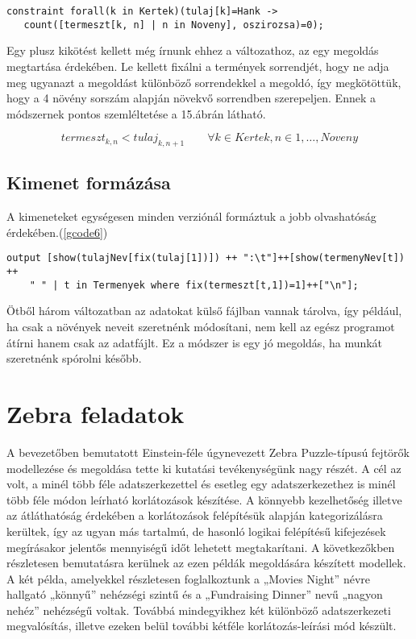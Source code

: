 \documentclass[12pt,a4paper]{report}
\begin{document}
   \begin{lstlisting}[caption="Count" bemutatása, label=gcode5]
   constraint forall(k in Kertek)(tulaj[k]=Hank ->
   count([termeszt[k, n] | n in Noveny], oszirozsa)=0); \end{lstlisting}

    Egy plusz kikötést kellett még írnunk ehhez a változathoz, az egy megoldás megtartása érdekében.
    Le kellett fixálni a termények sorrendjét, hogy ne adja meg ugyanazt a megoldást különböző sorrendekkel a megoldó, így megkötöttük, hogy a 4 növény sorszám alapján növekvő sorrendben szerepeljen.
    Ennek a módszernek pontos szemléltetése a 15.ábrán látható.

    \begin{equation}
    termeszt_{k,n} < tulaj_{k,n+1} \qquad \forall k \in Kertek, n \in 1,\dots,Noveny
	\end{equation}

\subsection{Kimenet formázása}

    A kimeneteket egységesen minden verziónál formáztuk a jobb olvashatóság érdekében.(\ref{gcode6})

   \begin{lstlisting}[caption="Output" formázása, label=gcode6]
   output [show(tulajNev[fix(tulaj[1])]) ++ ":\t"]++[show(termenyNev[t]) ++
    " " | t in Termenyek where fix(termeszt[t,1])=1]++["\n"];  \end{lstlisting}
   

    Ötből három változatban az adatokat külső fájlban vannak tárolva, így például, ha csak a növények neveit szeretnénk módosítani, nem kell az egész programot átírni hanem csak az adatfájlt.
    Ez a módszer is egy jó megoldás, ha munkát szeretnénk spórolni később.

\section{Zebra feladatok}
\label{sec_zebra}

    A bevezetőben bemutatott Einstein-féle úgynevezett Zebra Puzzle-típusú fejtörők\cite{zebra} modellezése és megoldása tette ki kutatási tevékenységünk nagy részét.
    A cél az volt, a minél több féle adatszerkezettel és esetleg egy adatszerkezethez is minél több féle módon leírható korlátozások készítése.
    A könnyebb kezelhetőség illetve az átláthatóság érdekében a korlátozások felépítésük alapján kategorizálásra kerültek, így az ugyan más tartalmú, de hasonló logikai felépítésű kifejezések megírásakor jelentős mennyiségű időt lehetett megtakarítani.
    A következőkben részletesen bemutatásra kerülnek az ezen példák megoldására készített modellek.
    A két példa, amelyekkel részletesen foglalkoztunk a „Movies Night” névre hallgató „könnyű” nehézségi szintű és a „Fundraising Dinner” nevű „nagyon nehéz” nehézségű voltak.
    Továbbá mindegyikhez két különböző adatszerkezeti megvalósítás, illetve ezeken belül további kétféle korlátozás-leírási mód készült.
\end{document}
